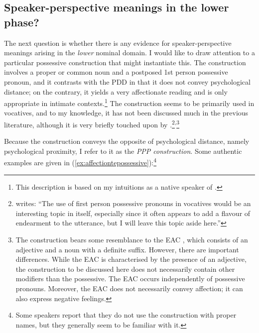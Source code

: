 \documentclass[output=paper]{langsci/langscibook}
\begin{document}
\subsection{Speaker-perspective meanings in the lower phase?}

The next question is whether there is any evidence for
speaker-perspective meanings arising  in the
\emph{lower} nominal domain.  I would like to draw attention to a particular
possessive construction that might instantiate this.  The construction
involves a proper or common noun  and a postposed 1st person possessive
pronoun, and it contrasts with  the \gls{PDD} in  that it does not convey psychological distance; on
the contrary, it yields a very affectionate reading and is only appropriate in
intimate contexts.\footnote{This description is based on my intuitions as a
native speaker of .} The construction seems to be primarily used
in vocatives, and to my knowledge, it has not been discussed much in the
previous literature, although it is very briefly touched upon by
\citet{julien2016predicationalvocatives}.\footnote{\citet[90]{julien2016predicationalvocatives}
    writes: ``The use of first person possessive pronouns in vocatives would be
    an interesting topic in itself, especially since it often appears to add a
    flavour of endearment to the utterance, but I will leave this topic aside
    here.''}\textsuperscript{,}\footnote{The construction bears some
    resemblance to the \gls{EAC}
    \citep[294ff]{halmoy2016nominal}, which consists of an adjective and a noun
    with a definite suffix.  However, there are important differences. While
    the \gls{EAC} is characterised by the presence of an adjective, the
    construction to be discussed here does not necessarily contain other
    modifiers than the possessive. The \gls{EAC} occurs independently of
    possessive pronouns. Moreover, the \gls{EAC} does not necessarily convey
affection; it can also express negative feelings.}

Because the construction  conveys the opposite	 of psychological distance,\linebreak
namely  psychological proximity, I refer to it as the \emph{\gls{PPP}
    construction}. Some authentic examples are given in
    (\ref{ex:affectiontepossessive}):\footnote{Some speakers report that they
    do not use the construction with proper names, but they generally seem to
be familiar with it.}
\end{document}
